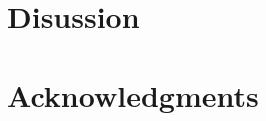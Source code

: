 \documentclass[10pt,letterpaper]{article}
\begin{document}
\section{Disussion}

\section{Acknowledgments}



\setlength{\bibleftmargin}{.125in}
\setlength{\bibindent}{-\bibleftmargin}


\end{document}
